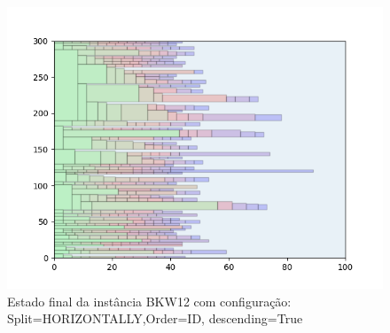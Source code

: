 \begin{figure}[H]
    \centering
    \caption[]{Estado final da instância BKW12 com configuração: Split=HORIZONTALLY,Order=ID, descending=True}
    \label{fig:bkw12-horizontally-id-true}
    \includegraphics[scale=0.5]{output/figures/bkw/bkw12/horizontally/id/true/000}
\end{figure}